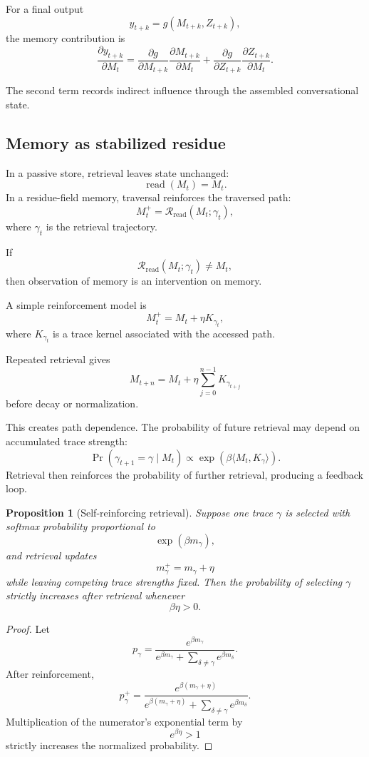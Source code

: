 \documentclass[11pt]{article}
\newtheorem{proposition}[definition]{Proposition}
\theoremstyle{definition}
\DeclareMathOperator{\Prob}{Pr}
\begin{document}
For a final output
\[
y_{t+k}
=
g(M_{t+k},Z_{t+k}),
\]
the memory contribution is
\[
\frac{\partial y_{t+k}}{\partial M_t}
=
\frac{\partial g}{\partial M_{t+k}}
\frac{\partial M_{t+k}}{\partial M_t}
+
\frac{\partial g}{\partial Z_{t+k}}
\frac{\partial Z_{t+k}}{\partial M_t}.
\]

The second term records indirect influence through the assembled conversational state.

\subsection{Memory as stabilized residue}

In a passive store, retrieval leaves state unchanged:
\[
\operatorname{read}(M_t)=M_t.
\]
In a residue-field memory, traversal reinforces the traversed path:
\[
M_t^{+}
=
\mathcal R_{\mathrm{read}}(M_t;\gamma_t),
\]
where \(\gamma_t\) is the retrieval trajectory.

If
\[
\mathcal R_{\mathrm{read}}(M_t;\gamma_t)\neq M_t,
\]
then observation of memory is an intervention on memory.

A simple reinforcement model is
\[
M_t^{+}
=
M_t+\eta K_{\gamma_t},
\]
where \(K_{\gamma_t}\) is a trace kernel associated with the accessed path.

Repeated retrieval gives
\[
M_{t+n}
=
M_t
+
\eta
\sum_{j=0}^{n-1}
K_{\gamma_{t+j}}
\]
before decay or normalization.

This creates path dependence. The probability of future retrieval may depend on accumulated trace strength:
\[
\Prob(\gamma_{t+1}=\gamma\mid M_t)
\propto
\exp
\left(
\beta
\langle
M_t,K_\gamma
\rangle
\right).
\]
Retrieval then reinforces the probability of further retrieval, producing a feedback loop.

\begin{proposition}[Self-reinforcing retrieval]
Suppose one trace \(\gamma\) is selected with softmax probability proportional to
\[
\exp(\beta m_\gamma),
\]
and retrieval updates
\[
m_\gamma^{+}=m_\gamma+\eta
\]
while leaving competing trace strengths fixed. Then the probability of selecting \(\gamma\) strictly increases after retrieval whenever
\[
\beta\eta>0.
\]
\end{proposition}

\begin{proof}
Let
\[
p_\gamma
=
\frac{e^{\beta m_\gamma}}
{e^{\beta m_\gamma}+\sum_{\delta\neq\gamma}e^{\beta m_\delta}}.
\]
After reinforcement,
\[
p_\gamma^{+}
=
\frac{e^{\beta(m_\gamma+\eta)}}
{e^{\beta(m_\gamma+\eta)}+\sum_{\delta\neq\gamma}e^{\beta m_\delta}}.
\]
Multiplication of the numerator's exponential term by
\[
e^{\beta\eta}>1
\]
strictly increases the normalized probability.
\end{proof}
\end{document}
